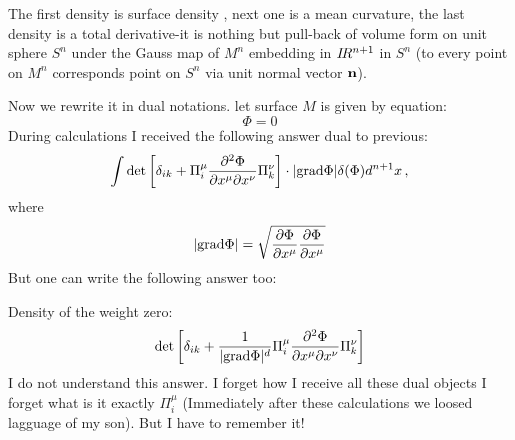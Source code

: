  The first density is surface density , next one is a mean curvature,
 the last density is a total derivative-it is nothing but pull-back of
 volume form on unit sphere $S^{n}$ under the Gauss map of $M^n$
 embedding in $I\!R^{n+1}$
 in $S^n$ (to every point on $M^n$ corresponds point on $S^n$ via
 unit normal vector ${\bf n}$).

Now we rewrite it in dual notations.
let surface $M$ is given by equation:
            $$
            \Phi=0
             $$
During calculations I received the following answer dual
to previous:
                     $$
                 \int
                 \det
                 \left[
                    \delta_{ik}+
                    \Pi^\mu_i
                 {\partial^2 \Phi\over \partial x^\mu\partial x^\nu}
                     \Pi^\nu_k
                     \right]
                     \cdot
                     |{\rm grad}\Phi|
                      \delta(\Phi)
                    d^{n+1}x\,,
                     $$
where
                      $$
 |{\rm grad}\Phi|=\sqrt
                       {
          {\partial\Phi\over \partial x^\mu}
            {\partial\Phi\over \partial x^\mu}
                   }
                    $$
But one can write the following answer too:

 Density of the weight zero:
                $$
                                \det
                 \left[
                    \delta_{ik}+
                      {1\over |{\rm grad}\Phi|^d}
                    \Pi^\mu_i
                 {\partial^2 \Phi\over \partial x^\mu\partial x^\nu}
                     \Pi^\nu_k
                     \right]
                     $$
          I do not understand this answer.
          I forget how I receive all these dual objects
          I forget what is it exactly $\Pi^\mu_i$
       (Immediately after these calculations we loosed lagguage
        of my son).
        But I have to remember it!



            \bye
